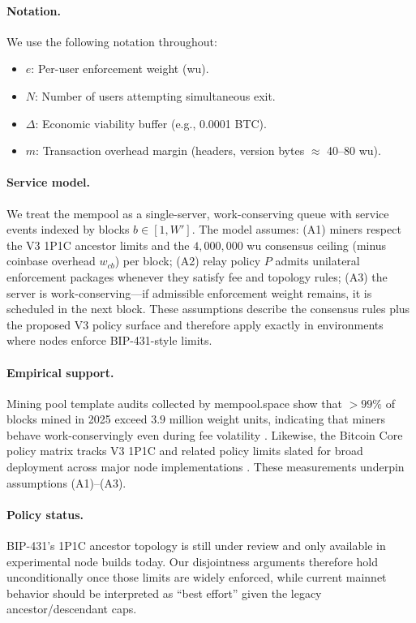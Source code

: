 \documentclass{article}
\theoremstyle{definition}
\begin{document}
\paragraph{Notation.} We use the following notation throughout:
\begin{itemize}
    \itemsep0em
    \item $e$: Per-user enforcement weight (wu).
    \item $N$: Number of users attempting simultaneous exit.
    \item $\Delta$: Economic viability buffer (e.g., 0.0001 BTC).
    \item $m$: Transaction overhead margin (headers, version bytes $\approx$ 40--80 wu).
\end{itemize}

\paragraph{Service model.}
We treat the mempool as a single-server, work-conserving queue with service events indexed by blocks $b \in [1,W']$. The model assumes: (A1) miners respect the V3 1P1C ancestor limits and the $4{,}000{,}000$ wu consensus ceiling (minus coinbase overhead $w_{cb}$) per block; (A2) relay policy $P$ admits unilateral enforcement packages whenever they satisfy fee and topology rules; (A3) the server is work-conserving---if admissible enforcement weight remains, it is scheduled in the next block. These assumptions describe the consensus rules plus the proposed V3 policy surface and therefore apply exactly in environments where nodes enforce BIP-431-style limits.

\paragraph{Empirical support.}
Mining pool template audits collected by mempool.space show that $>99\%$ of blocks mined in 2025 exceed $3.9$ million weight units, indicating that miners behave work-conservingly even during fee volatility \cite{mempoolspaceWeight}. Likewise, the Bitcoin Core policy matrix tracks V3 1P1C and related policy limits slated for broad deployment across major node implementations \cite{policyMatrix}. These measurements underpin assumptions (A1)--(A3).

\paragraph{Policy status.}
BIP-431's 1P1C ancestor topology is still under review and only available in experimental node builds today. Our disjointness arguments therefore hold unconditionally once those limits are widely enforced, while current mainnet behavior should be interpreted as ``best effort'' given the legacy ancestor/descendant caps.
\end{document}
